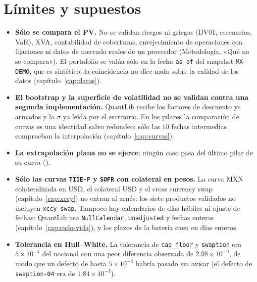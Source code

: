 \section{Límites y supuestos}\label{sec:cap12-limites}

\begin{limites}
  \begin{itemize}
    \item \textbf{Sólo se compara el PV.} No se validan riesgos ni griegas (DV01, escenarios, VaR), XVA, contabilidad
      de coberturas, envejecimiento de operaciones con fijaciones ni datos de mercado reales de un proveedor
      (Metodología, «Qué no se compara»). El portafolio se valúa sólo en la fecha \texttt{as\_of} del snapshot
      \texttt{MX-DEMO}, que es sintético; la coincidencia no dice nada sobre la calidad de los datos
      (capítulo~\ref{cap:datos}).
    \item \textbf{El bootstrap y la superficie de volatilidad no se validan contra una segunda implementación.}
      QuantLib recibe los factores de descuento ya armados y la $\sigma$ ya leída por el escritorio. En los
      pilares la comparación de curvas es una identidad salvo redondeo; sólo las $10$ fechas intermedias
      comprueban la interpolación (capítulo~\ref{cap:curvas}).
    \item \textbf{La extrapolación plana no se ejerce}: ningún caso pasa del último pilar de su curva
      ().
    \item \textbf{Sólo las curvas \texttt{TIIE-F} y \texttt{SOFR} con colateral en pesos.} La curva MXN colateralizada en USD, el
      colateral USD y el cross currency swap (capítulo~\ref{cap:xccy}) no entran al arnés: los siete productos validados no
      incluyen \texttt{xccy\_swap}. Tampoco hay calendarios de días hábiles ni ajuste de fechas: QuantLib usa
      \texttt{NullCalendar}, \texttt{Unadjusted} y fechas enteras (capítulo~\ref{cap:ciclo-vida}), y los plazos de la
      batería caen en días enteros.
    \item \textbf{Tolerancia en Hull--White.} La tolerancia de \texttt{cap\_floor} y \texttt{swaption} era
      $5\times 10^{-4}$ del nocional con una peor diferencia observada de $2.98\times 10^{-9}$, de modo que un defecto de
      hasta $5\times 10^{-4}$ habría pasado sin avisar (el defecto de \texttt{swaption-04} era de $1.84\times 10^{-3}$).

\end{itemize}
\end{limites}
